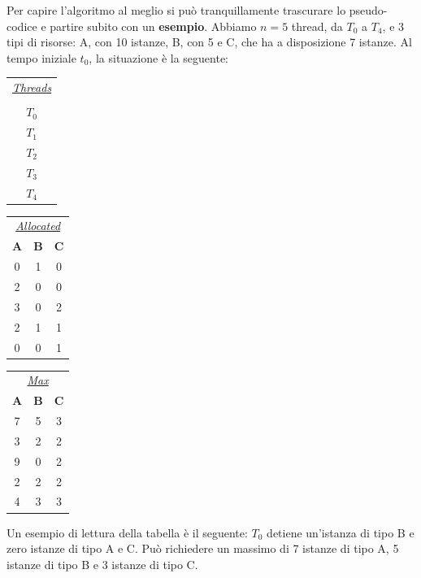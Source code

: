 Per capire l'algoritmo al meglio si può tranquillamente trascurare lo pseudo-codice e partire subito con un \textbf{esempio}. Abbiamo $n = 5$ thread, da $T_0$ a $T_4$, e 3 tipi di risorse: A, con 10 istanze, B, con 5 e C, che ha a disposizione 7 istanze. Al tempo iniziale $t_0$, la situazione è la seguente:
\begin{table}[!h]
    \centering
    \begin{tabular}{c}
         \underline{\textit{Threads}} \\\\ $T_0$ \\ $T_1$ \\ $T_2$ \\ $T_3$ \\ $T_4$
    \end{tabular}
    \begin{tabular}{c c c}
         \multicolumn{3}{c}{\underline{\textit{Allocated}}} \\
         \textbf{A} & \textbf{B} & \textbf{C} \\
         0 & 1 & 0 \\
         2 & 0 & 0 \\
         3 & 0 & 2 \\
         2 & 1 & 1 \\
         0 & 0 & 1
    \end{tabular}
    \hspace{5px}
    \begin{tabular}{c c c}
         \multicolumn{3}{c}{\underline{\textit{Max}}} \\
         \textbf{A} & \textbf{B} & \textbf{C} \\
         7 & 5 & 3 \\
         3 & 2 & 2 \\
         9 & 0 & 2 \\
         2 & 2 & 2 \\
         4 & 3 & 3 \\
    \end{tabular}    
\end{table}

\noindent Un esempio di lettura della tabella è il seguente: $T_0$ detiene un'istanza di tipo B e zero istanze di tipo A e C. Può richiedere un massimo di 7 istanze di tipo A, 5 istanze di tipo B e 3 istanze di tipo C.

